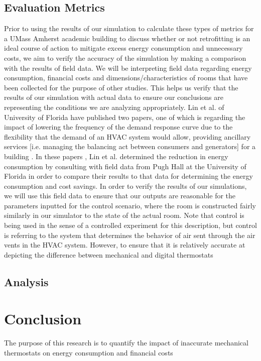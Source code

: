 \documentclass[conference,letterpaper]{IEEEtran}
\begin{document}
\subsection{Evaluation Metrics}
Prior to using the results of our simulation to calculate these types of metrics for a UMass Amherst academic building to discuss whether or not retrofitting is an ideal course of action to mitigate excess energy consumption and unnecessary costs, we aim to verify the accuracy of the simulation by making a comparison with the results of field data. We will be interpreting field data regarding energy consumption, financial costs and dimensions/characteristics of rooms that have been collected for the purpose of other studies. This helps us verify that the results of our simulation with actual data to ensure our conclusions are representing the conditions we are analyzing appropriately. Lin et al. of University of Florida have published two papers, one of which is regarding the impact of lowering the frequency of the demand response curve due to the flexibility that the demand of an HVAC system would allow, providing ancillary services [i.e. managing the balancing act between consumers and generators] for a building \cite{6687952}. In these papers \cite{6687952, 7171796}, Lin et al. determined the reduction in energy consumption by consulting with field data from Pugh Hall at the University of Florida in order to compare their results to that data for determining the energy consumption and cost savings. In order to verify the results of our simulations, we will use this field data to ensure that our outputs are reasonable for the parameters inputted for the control scenario, where the room is constructed fairly similarly in our simulator to the state of the actual room. Note that control is being used in the sense of a controlled experiment for this description, but control is referring to the system that determines the behavior of air sent through the air vents in the HVAC system. However, to ensure that it is relatively accurate at depicting the difference between mechanical and digital thermostats 
\subsection{Analysis}

\section{Conclusion}
\label{sec:Conclusion}
The purpose of this research is to quantify the impact of inaccurate mechanical thermostats on energy consumption and financial costs 



\end{document}
